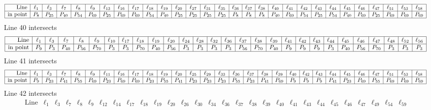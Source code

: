 \documentclass{article}
\begin{document}
{$$\begin{array}{|r*{28}{|c}|}
\hline
\mbox{Line}  & \ell_{1} & \ell_{3} & \ell_{7} & \ell_{8} & \ell_{9} & \ell_{13} & \ell_{16} & \ell_{17} & \ell_{18} & \ell_{19} & \ell_{20} & \ell_{27} & \ell_{31} & \ell_{35} & \ell_{36} & \ell_{37} & \ell_{38} & \ell_{40} & \ell_{41} & \ell_{42} & \ell_{43} & \ell_{44} & \ell_{45} & \ell_{46} & \ell_{47} & \ell_{51} & \ell_{53} & \ell_{58}\\
\hline
\mbox{in point}  & P_{8} & P_{25} & P_{40} & P_{54} & P_{69} & P_{25} & P_{69} & P_{69} & P_{54} & P_{40} & P_{25} & P_{25} & P_{25} & P_{25} & P_{8} & P_{8} & P_{8} & P_{40} & P_{69} & P_{54} & P_{25} & P_{54} & P_{40} & P_{69} & P_{25} & P_{69} & P_{69} & P_{69}\\
\hline
\end{array}
$$
Line 40 intersects 
$$
\begin{array}{|r*{27}{|c}|}
\hline
\mbox{Line}  & \ell_{1} & \ell_{3} & \ell_{7} & \ell_{8} & \ell_{9} & \ell_{10} & \ell_{17} & \ell_{18} & \ell_{19} & \ell_{20} & \ell_{24} & \ell_{28} & \ell_{32} & \ell_{36} & \ell_{37} & \ell_{38} & \ell_{39} & \ell_{41} & \ell_{42} & \ell_{43} & \ell_{44} & \ell_{45} & \ell_{46} & \ell_{47} & \ell_{48} & \ell_{52} & \ell_{56}\\
\hline
\mbox{in point}  & P_{9} & P_{3} & P_{40} & P_{56} & P_{70} & P_{3} & P_{3} & P_{70} & P_{40} & P_{56} & P_{3} & P_{3} & P_{3} & P_{3} & P_{56} & P_{70} & P_{40} & P_{9} & P_{9} & P_{9} & P_{3} & P_{40} & P_{56} & P_{70} & P_{3} & P_{3} & P_{3}\\
\hline
\end{array}
$$
Line 41 intersects 
$$
\begin{array}{|r*{28}{|c}|}
\hline
\mbox{Line}  & \ell_{1} & \ell_{3} & \ell_{7} & \ell_{8} & \ell_{9} & \ell_{11} & \ell_{16} & \ell_{17} & \ell_{18} & \ell_{19} & \ell_{20} & \ell_{25} & \ell_{29} & \ell_{33} & \ell_{36} & \ell_{37} & \ell_{38} & \ell_{39} & \ell_{40} & \ell_{42} & \ell_{43} & \ell_{44} & \ell_{45} & \ell_{46} & \ell_{47} & \ell_{51} & \ell_{53} & \ell_{58}\\
\hline
\mbox{in point}  & P_{9} & P_{23} & P_{41} & P_{55} & P_{69} & P_{23} & P_{69} & P_{69} & P_{23} & P_{55} & P_{41} & P_{23} & P_{23} & P_{23} & P_{55} & P_{23} & P_{41} & P_{69} & P_{9} & P_{9} & P_{9} & P_{41} & P_{23} & P_{69} & P_{55} & P_{69} & P_{69} & P_{69}\\
\hline
\end{array}
$$
Line 42 intersects 
$$
\begin{array}{|r*{28}{|c}|}
\hline
\mbox{Line}  & \ell_{1} & \ell_{3} & \ell_{7} & \ell_{8} & \ell_{9} & \ell_{12} & \ell_{14} & \ell_{17} & \ell_{18} & \ell_{19} & \ell_{20} & \ell_{26} & \ell_{30} & \ell_{34} & \ell_{36} & \ell_{37} & \ell_{38} & \ell_{39} & \ell_{40} & \ell_{41} & \ell_{43} & \ell_{44} & \ell_{45} & \ell_{46} & \ell_{47} & \ell_{49} & \ell_{54} & \ell_{59}\\

\end{array}$$}
\end{document}
